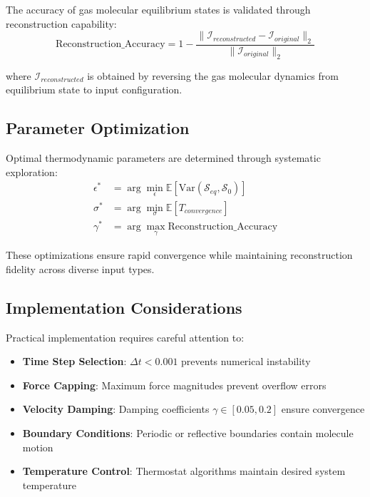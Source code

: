 \documentclass[11pt,a4paper]{article}
\begin{document}
The accuracy of gas molecular equilibrium states is validated through reconstruction capability:
\begin{equation}
\text{Reconstruction\_Accuracy} = 1 - \frac{\|\mathcal{I}_{reconstructed} - \mathcal{I}_{original}\|_2}{\|\mathcal{I}_{original}\|_2}
\label{eq:reconstruction-accuracy}
\end{equation}

where $\mathcal{I}_{reconstructed}$ is obtained by reversing the gas molecular dynamics from equilibrium state to input configuration.

\subsection{Parameter Optimization}

Optimal thermodynamic parameters are determined through systematic exploration:
\begin{align}
\epsilon^* &= \arg\min_{\epsilon} \mathbb{E}[\text{Var}(\mathcal{S}_{eq}, \mathcal{S}_0)] \label{eq:epsilon-optimization} \\
\sigma^* &= \arg\min_{\sigma} \mathbb{E}[T_{convergence}] \label{eq:sigma-optimization} \\
\gamma^* &= \arg\max_{\gamma} \text{Reconstruction\_Accuracy} \label{eq:gamma-optimization}
\end{align}

These optimizations ensure rapid convergence while maintaining reconstruction fidelity across diverse input types.

\subsection{Implementation Considerations}

Practical implementation requires careful attention to:
\begin{itemize}
\item \textbf{Time Step Selection}: $\Delta t < 0.001$ prevents numerical instability
\item \textbf{Force Capping}: Maximum force magnitudes prevent overflow errors
\item \textbf{Velocity Damping}: Damping coefficients $\gamma \in [0.05, 0.2]$ ensure convergence
\item \textbf{Boundary Conditions}: Periodic or reflective boundaries contain molecule motion
\item \textbf{Temperature Control}: Thermostat algorithms maintain desired system temperature
\end{itemize}
\end{document}

